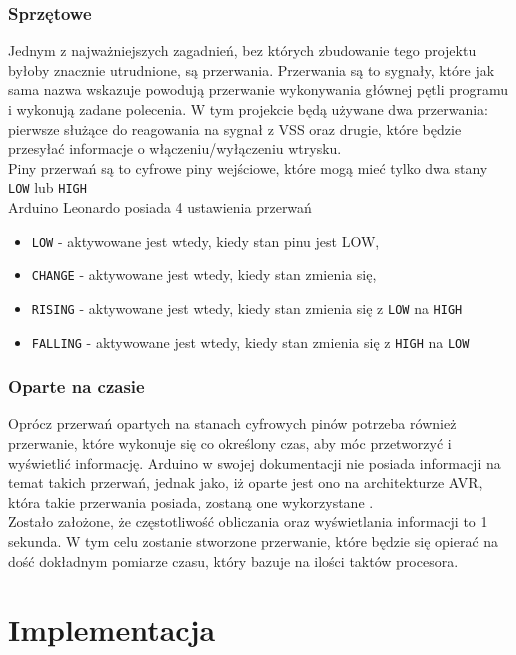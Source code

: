 \subsubsection{Sprzętowe}
Jednym z najważniejszych zagadnień, bez których zbudowanie tego projektu byłoby znacznie utrudnione, są przerwania. Przerwania są to sygnały, które jak sama nazwa wskazuje powodują przerwanie wykonywania głównej pętli programu i wykonują zadane polecenia. W tym projekcie będą używane dwa przerwania: pierwsze służące do reagowania na sygnał z VSS oraz drugie, które będzie przesyłać informacje o włączeniu/wyłączeniu wtrysku.\\

Piny przerwań są to cyfrowe piny wejściowe, które mogą mieć tylko dwa stany \texttt{LOW} lub \texttt{HIGH}\\

Arduino Leonardo posiada 4 ustawienia przerwań \cite{ard_ref}
\begin{itemize}
    \item \texttt{LOW} - aktywowane jest wtedy, kiedy stan pinu jest LOW,
    \item \texttt{CHANGE} - aktywowane jest wtedy, kiedy stan zmienia się,
    \item \texttt{RISING} - aktywowane jest wtedy, kiedy stan zmienia się z \texttt{LOW} na \texttt{HIGH} 
    \item \texttt{FALLING} - aktywowane jest wtedy, kiedy stan zmienia się z \texttt{HIGH} na \texttt{LOW} 
\end{itemize}

\subsubsection{Oparte na czasie}
Oprócz przerwań opartych na stanach cyfrowych pinów potrzeba również przerwanie, które wykonuje się co określony czas, aby móc przetworzyć i wyświetlić informację. Arduino w swojej dokumentacji nie posiada informacji na temat takich przerwań, jednak jako, iż oparte jest ono na architekturze AVR, która takie przerwania posiada, zostaną one wykorzystane \cite{atmega_datasheet}.\\
Zostało założone, że częstotliwość obliczania oraz wyświetlania informacji to 1 sekunda. W tym celu zostanie stworzone przerwanie, które będzie się opierać na dość dokładnym pomiarze czasu, który bazuje na ilości taktów procesora.\\

\section{Implementacja}
